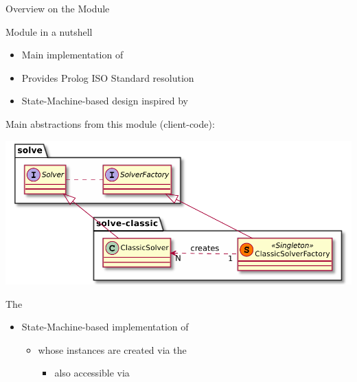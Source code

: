 \documentclass[handout]{beamer}
\begin{document}
\begin{frame}[allowframebreaks]{Overview on the  Module}

    \begin{block}{Module  in a nutshell}
        \begin{itemize}
            \item Main implementation of 
            
            \item Provides Prolog ISO Standard resolution
            
            \item State-Machine-based design inspired by \cite{tuprolog-sac08} 
        \end{itemize}
    \end{block}

    \framebreak

    Main abstractions from this module (\alert{client-code}):
    \begin{center}
        \includegraphics[width=.6\linewidth]{img/classic.pdf}
    \end{center}

    \begin{block}{The }
        \begin{itemize}
            \item State-Machine-based implementation of 
            \begin{itemize}
                \item whose instances are created via the 
                \begin{itemize}
                    \item also accessible via 
                \end{itemize}
            \end{itemize}
        \end{itemize}
    \end{block}

    \framebreak


\end{frame}
\end{document}
